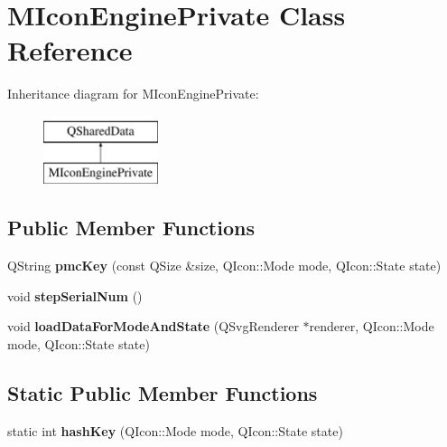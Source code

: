 \hypertarget{class_m_icon_engine_private}{}\section{M\+Icon\+Engine\+Private Class Reference}
\label{class_m_icon_engine_private}
Inheritance diagram for M\+Icon\+Engine\+Private\+:\begin{figure}[H]
\begin{center}
\leavevmode
\includegraphics[height=2.000000cm]{class_m_icon_engine_private}
\end{center}
\end{figure}
\subsection*{Public Member Functions}
\begin{DoxyCompactItemize}
\item 
\mbox{\label{class_m_icon_engine_private_ac10c184921c3728920e05cc7fafad90b}} 
Q\+String {\bfseries pmc\+Key} (const Q\+Size \&size, Q\+Icon\+::\+Mode mode, Q\+Icon\+::\+State state)
\item 
\mbox{\label{class_m_icon_engine_private_a1005525d0a325b103ac8b8b09446cfaa}} 
void {\bfseries step\+Serial\+Num} ()
\item 
\mbox{\label{class_m_icon_engine_private_a2ab257fe09973258eae650b7556b1ece}} 
void {\bfseries load\+Data\+For\+Mode\+And\+State} (Q\+Svg\+Renderer $\ast$renderer, Q\+Icon\+::\+Mode mode, Q\+Icon\+::\+State state)
\end{DoxyCompactItemize}
\subsection*{Static Public Member Functions}
\begin{DoxyCompactItemize}
\item 
\mbox{\label{class_m_icon_engine_private_a1e5b2a8a77c431777c8a4bbeb4694840}} 
static int {\bfseries hash\+Key} (Q\+Icon\+::\+Mode mode, Q\+Icon\+::\+State state)
\end{DoxyCompactItemize}
